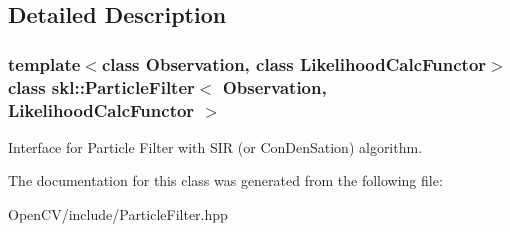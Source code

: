 \subsection{Detailed Description}
\subsubsection*{template$<$class Observation, class Likelihood\+Calc\+Functor$>$\newline
class skl\+::\+Particle\+Filter$<$ Observation, Likelihood\+Calc\+Functor $>$}

Interface for Particle Filter with S\+IR (or Con\+Den\+Sation) algorithm. 

The documentation for this class was generated from the following file\+:\begin{DoxyCompactItemize}
\item 
Open\+C\+V/include/Particle\+Filter.\+hpp\end{DoxyCompactItemize}
